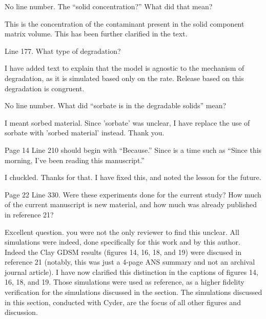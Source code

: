 \documentclass[answers,12pt]{exam}
\begin{document}
\begin{questions}
\question No line number. The ``solid concentration?'' What did that mean?
\begin{solution}
This is the concentration of the contaminant present in the solid component 
        matrix volume. This has been further clarified in the text.
\end{solution}
 

\question Line 177. What type of degradation?
\begin{solution}
        I have added text to explain that the model is agnostic to the 
        mechanism of degradation, as it is simulated based only on the rate.  
        Release based on this degradation is congruent.
\end{solution}

 

\question No line number. What did ``sorbate is in the degradable solids'' 
mean?
\begin{solution}
I meant sorbed material. Since 'sorbate' was unclear, I have replace the use of 
        sorbate with 'sorbed material' instead. Thank you.
\end{solution}
 

\question Page 14 Line 210 should begin with ``Because.'' Since is a time such 
as ``Since this morning, I've been reading this manuscript.''
\begin{solution}
I chuckled. Thanks for that. I have fixed this, and noted the lesson for the 
future.  \end{solution}

 

\question Page 22 Line 330. Were these experiments done for the current study? 
How much of the current manuscript is new material, and how much was already 
published in reference 21?
\begin{solution}
Excellent question. you were not the only reviewer to find this unclear. All 
        simulations were indeed, done specifically for this work and by this 
        author. Indeed the Clay GDSM results (figures 14, 16, 18, and 19) were 
        discused in reference 21 (notably, this was just a 4-page ANS summary 
        and not an archival journal article).
        I have now clarified this distinction in the captions of figures 14, 
        16, 18, and 19. Those simulations were used as reference, as a higher 
        fidelity verification for the simulations discussed in the section. The 
        simulations discussed in this section, conducted with Cyder, are the 
focus of all other figures and discussion.  \end{solution}


\end{questions}
\end{document}
